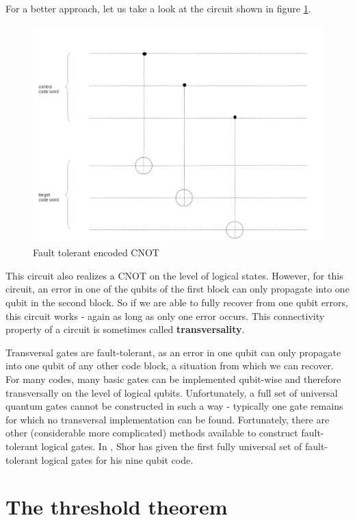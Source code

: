 \documentclass[a4paper, draft]{article}
\theoremstyle{own}
\theoremstyle{remark}
\begin{document}
For a better approach, let us take a look at the circuit shown in figure \ref{fig:EncodedCNOT_Two}. 
\begin{figure}[ht]
\centering
\includegraphics[width=0.7\linewidth]{images/EncodedCNOT_Two}
\caption[Fault tolerant encoded CNOT]{Fault tolerant encoded CNOT}
\label{fig:EncodedCNOT_Two}
\end{figure}
This circuit also realizes a CNOT on the level of logical states. However, for this circuit, an error in one of the qubits of the first block can only propagate into one qubit in the second block.  So if we are able to fully recover from one qubit errors, this circuit works - again as long as only one error occurs. This connectivity property of a circuit is sometimes called {\bf transversality}.

Transversal gates are fault-tolerant, as an error in one qubit can only propagate into one qubit of any other code block, a situation from which we can recover. For many codes, many basic gates can be implemented qubit-wise and therefore transversally on the level of logical qubits. Unfortunately, a full set of universal quantum gates cannot be constructed in such a way - typically one gate remains for which no transversal implementation can be found. Fortunately, there are other (considerable more complicated) methods available to construct fault-tolerant logical gates. In \cite{Shor96}, Shor has given the first fully universal set of fault-tolerant logical gates for his nine qubit code. 




\section{The threshold theorem}
\end{document}
